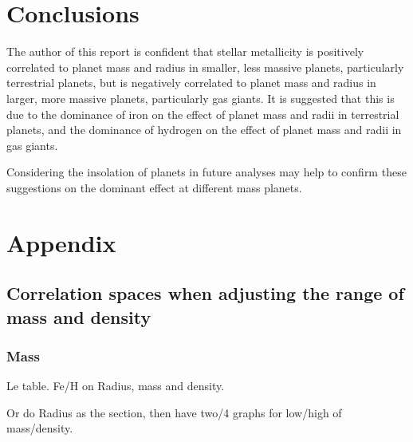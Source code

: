 \documentclass[a4paper,twocolumn,12pt]{article}
\begin{document}
\section{Conclusions}
The author of this report is confident that stellar metallicity is positively correlated to planet mass and radius in smaller, less massive planets, particularly terrestrial planets, but is negatively correlated to planet mass and radius in larger, more massive planets, particularly gas giants. It is suggested that this is due to the dominance of iron on the effect of planet mass and radii in terrestrial planets, and the dominance of hydrogen on the effect of planet mass and radii in gas giants.

Considering the insolation of planets in future analyses may help to confirm these suggestions on the dominant effect at different mass planets.


\section{Appendix}
\subsection{Correlation spaces when adjusting the range of mass and density}
\subsubsection{Mass}

Le table. Fe/H on Radius, mass and density.

Or do Radius as the section, then have two/4 graphs for low/high of mass/density.



\vspace{-1em}
\footnotesize

\end{document}
